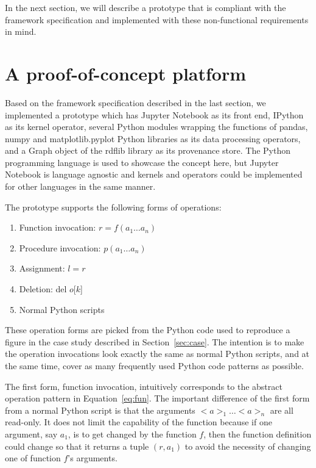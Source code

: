 In the next section, we will describe a prototype that is compliant with the framework specification and implemented with these non-functional requirements in mind.



\section{A proof-of-concept platform}
\label{sec:prototype}
Based on the framework specification described in the last section, we implemented a prototype which has Jupyter Notebook as its front end, IPython as its kernel operator, several Python modules wrapping the functions of pandas, numpy and matplotlib.pyplot Python libraries as its data processing operators, and a Graph object of the rdflib library as its provenance store. The Python programming language is used to showcase the concept here, but Jupyter Notebook is language agnostic and kernels and operators could be implemented for other languages in the same manner.

The prototype supports the following forms of operations:
\begin{enumerate}
	\item Function invocation: $r = f(a_1\dots a_n)$
	\item Procedure invocation: $p(a_1\dots a_n)$
	\item Assignment: $l = r$
	\item Deletion: del $o$[$k$]
	\item Normal Python scripts
\end{enumerate}
These operation forms are picked from the Python code used to reproduce a figure in the case study described in Section~\ref{sec:case}. The intention is to make the operation invocations look exactly the same as normal Python scripts, and at the same time, cover as many frequently used Python code patterns as possible.

The first form, function invocation, intuitively corresponds to the abstract operation pattern in Equation~\ref{eq:fun}. The important difference of the first form from a normal Python script is that the arguments $<a>_1\dots<a>_n$ are all read-only. It does not limit the capability of the function because if one argument, say $a_1$, is to get changed by the function $f$, then the function definition could change so that it returns a tuple $(r, a_1)$ to avoid the necessity of changing one of function $f$'s arguments.


